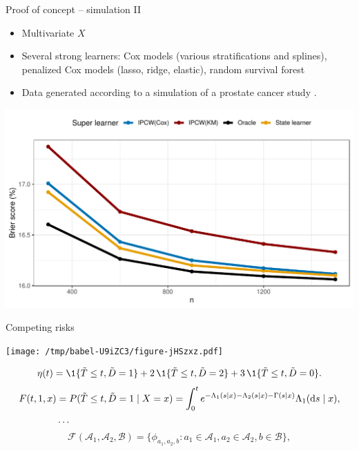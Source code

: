 \documentclass[smaller]{beamer}\usepackage{listings}
\begin{document}
\begin{frame}[label={sec:org5bd879d}]{Proof of concept -- simulation II}
\small

\begin{itemize}
\item Multivariate \(X\)
\item Several strong learners: Cox models (various stratifications and splines),
penalized Cox models (lasso, ridge, elastic), random survival forest
\item Data generated according to a simulation of a prostate cancer study
\citep{kattan2000pretreatment,gerds2013estimating}.
\end{itemize}

\begin{center}
\includegraphics[width=.9\textwidth]{./zelefski-sim.pdf}
\end{center}
\end{frame}

\begin{frame}[label={sec:orgc78d9f5}]{Competing risks}
\small

\begin{center}
\texttt{[image: /tmp/babel-U9iZC3/figure-jHSzxz.pdf]}
\end{center}

\begin{equation*}
  \eta(t) = \1{\{\tilde{T} \leq t, \tilde{D} = 1\}} +
  2 \, \1{\{\tilde{T} \leq t, \tilde{D} = 2\}}
  +
  3 \, \1{\{\tilde{T} \leq t, \tilde{D} = 0\}}.
\end{equation*}
\begin{align*}
  F(t, 1, x)
  & = P(\tilde{T} \leq t, \tilde{D}=1 \mid X=x)
    = \int_0^t e^{-\Lambda_1(s \mid x) -\Lambda_2(s \mid x) - \Gamma(s \mid x) }  \Lambda_1(\mathop{}\!\mathrm{d} s \mid x),
  \\
  & \dots
\end{align*}
\begin{equation*}
  \mathcal{F}(\mathcal{A}_1,\mathcal{A}_2, \mathcal{B})
  = \{ \phi_{a_1, a_2, b} : a_1 \in \mathcal{A}_1, a_2 \in \mathcal{A}_2, b \in \mathcal{B}\},
\end{equation*}
\end{frame}
\end{document}
